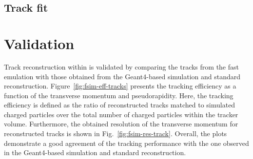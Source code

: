 \subsection{Track fit}


\section{Validation}
\label{sec:fsim-validation}

Track reconstruction within \FSIM is validated by comparing the tracks from the fast emulation with those obtained from the Geant4-based simulation and standard reconstruction. Figure~\ref{fig:fsim-eff-tracks} presents the tracking efficiency as a function of the transverse momentum and pseudorapidity. Here, the tracking efficiency is defined as the ratio of reconstructed tracks matched to simulated charged particles over the total number of charged particles within the tracker volume. Furthermore, the obtained resolution of the transverse momentum for reconstructed tracks is shown in Fig.~\ref{fig:fsim-res-track}. Overall, the plots demonstrate a good agreement of the \FSIM tracking performance with the one observed in the Geant4-based simulation and standard reconstruction.


